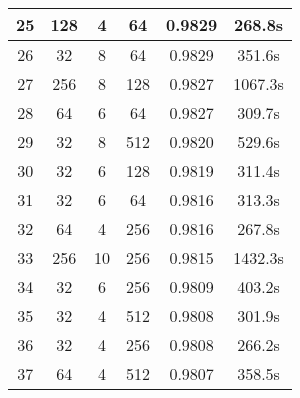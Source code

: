 \begin{table}[htbp]
\begin{center}
\begin{tabular}{|c|c|c|c|c|c|}
      \hline
      25            & 128                   & 4                       & 64                         & 0.9829                     & 268.8s                      \\
      \hline
      26            & 32                    & 8                       & 64                         & 0.9829                     & 351.6s                      \\
      \hline
      27            & 256                   & 8                       & 128                        & 0.9827                     & 1067.3s                     \\
      \hline
      28            & 64                    & 6                       & 64                         & 0.9827                     & 309.7s                      \\
      \hline
      29            & 32                    & 8                       & 512                        & 0.9820                     & 529.6s                      \\
      \hline
      30            & 32                    & 6                       & 128                        & 0.9819                     & 311.4s                      \\
      \hline
      31            & 32                    & 6                       & 64                         & 0.9816                     & 313.3s                      \\
      \hline
      32            & 64                    & 4                       & 256                        & 0.9816                     & 267.8s                      \\
      \hline
      33            & 256                   & 10                      & 256                        & 0.9815                     & 1432.3s                     \\
      \hline
      34            & 32                    & 6                       & 256                        & 0.9809                     & 403.2s                      \\
      \hline
      35            & 32                    & 4                       & 512                        & 0.9808                     & 301.9s                      \\
      \hline
      36            & 32                    & 4                       & 256                        & 0.9808                     & 266.2s                      \\
      \hline
      37            & 64                    & 4                       & 512                        & 0.9807                     & 358.5s                      \\

\end{tabular}
\end{center}
\end{table}
